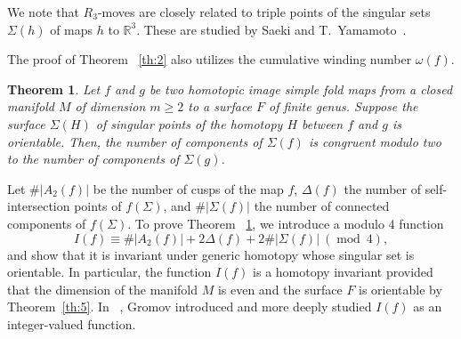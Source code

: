 \documentclass[12pt]{amsart}
\def \R{\mathbb{R}}
\def \Z{\mathbb{Z}}
\def\mod{{\mathop\mathrm{mod}\ }}
\newtheorem{theorem}{Theorem}[section]
\theoremstyle{definition}
\begin{document}
 
We note that $R_3$-moves are closely related to triple points of the singular sets $\Sigma(h)$ of maps $h$ to $\R^3$. These are studied by Saeki and T.~Yamamoto~\cite{SY}. 

 
 The proof of Theorem ~\ref{th:2} also utilizes the cumulative winding number $\omega(f)$.  
 
 
 
  \begin{theorem}\label{th:3} 
Let $f$ and $g$ be two homotopic image simple fold maps  %
 from a closed manifold $M$ of dimension  $m\geq2$ to a surface $F$ of finite genus. 
Suppose the surface $\Sigma(H)$ of singular points of the homotopy $H$ between $f$ and $g$ is orientable. Then, the number of components of $\Sigma(f)$ is congruent modulo two to the number of components of $\Sigma(g)$. 
 \end{theorem}


Let $ \#|A_2(f)|$ be the number of cusps of the map $f$, $\Delta(f)$ the number of self-intersection points of $f(\Sigma)$, and $\#|\Sigma(f)|$  the number of connected components of $f(\Sigma)$. To prove Theorem ~\ref{th:3}, we introduce a modulo $4$  function
\[
   I(f) \equiv \#|A_2(f)| + 2\Delta(f) +  2\#|\Sigma(f)| \ (\mod 4),
\]   
and show that it is invariant under generic homotopy whose singular set is orientable. In particular, the function $I(f)$ is a homotopy invariant provided that the dimension of the manifold $M$ is even and the surface $F$ is orientable by Theorem~\ref{th:5}.
  In ~\cite{Gr},  Gromov introduced and more deeply studied $I(f)$ as an integer-valued function.  
\end{document}
